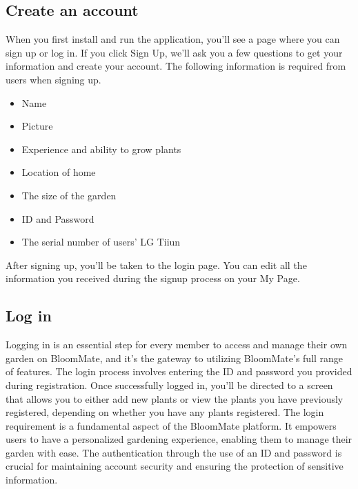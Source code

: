 \documentclass[conference, a4paper]{IEEEtran}
\begin{document}
\subsection{Create an account}
When you first install and run the application, you'll see a page where you can sign up or log in. If you click Sign Up, we'll ask you a few questions to get your information and create your account. The following information is required from users when signing up.
\begin{itemize}
    \item Name
    \item Picture
    \item Experience and ability to grow plants
    \item Location of home
    \item The size of the garden
    \item ID and Password
    \item The serial number of users' LG Tiiun
\end{itemize}
After signing up, you’ll be taken to the login page. You can edit all the information you received during the signup process on your My Page.\\
\subsection{Log in}
Logging in is an essential step for every member to access and manage their own garden on BloomMate, and it's the gateway to utilizing BloomMate's full range of features. The login process involves entering the ID and password you provided during registration. Once successfully logged in, you'll be directed to a screen that allows you to either add new plants or view the plants you have previously registered, depending on whether you have any plants registered. The login requirement is a fundamental aspect of the BloomMate platform. It empowers users to have a personalized gardening experience, enabling them to manage their garden with ease. The authentication through the use of an ID and password is crucial for maintaining account security and ensuring the protection of sensitive information. \\
\end{document}
